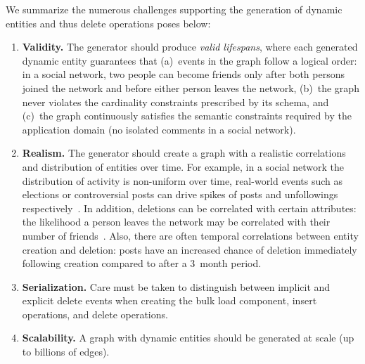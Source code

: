 We summarize the numerous challenges supporting the generation of dynamic entities and thus delete operations poses below:
\begin{enumerate}
\item \textbf{Validity.} The generator should produce \emph{valid lifespans},
where each generated dynamic entity guarantees that
(a)~events in the graph follow a logical order: \eg in a social network, two people can become friends only after both persons joined the network and before either person leaves the network,
(b)~the graph never violates the cardinality constraints prescribed by its schema, and
(c)~the graph continuously satisfies the semantic constraints required by the application domain (\eg no isolated comments in a social network).
\item \textbf{Realism.} The generator should create a graph with a realistic correlations and distribution of entities over time.
For example, in a social network the distribution of activity is non-uniform over time, real-world events such as elections or controversial posts %
can drive spikes of posts and unfollowings respectively~\cite{DBLP:conf/www/MyersL14}.
In addition, deletions can be correlated with certain attributes: \eg the likelihood a person leaves the network may be correlated with their number of friends~\cite{Lorincz2019}.
Also, there are often temporal correlations between entity creation and deletion: \eg posts have an increased chance of deletion immediately following creation compared to after a 3~month period.
\item \textbf{Serialization.} Care must be taken to distinguish between implicit and explicit delete events when creating the bulk load component, insert operations, and delete operations.
\item \textbf{Scalability.} A graph with dynamic entities should be generated at scale (up to billions of edges).
\end{enumerate}



